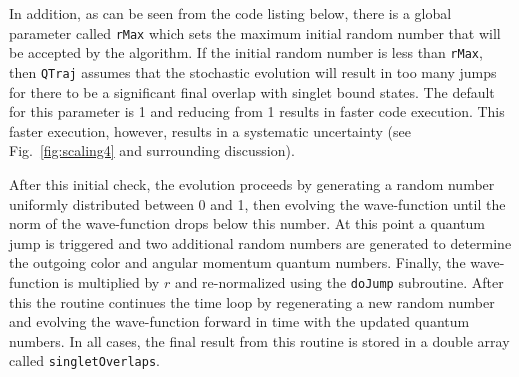 \documentclass[times,sort&compress,final]{elsarticle}
\def\qtraj{{\tt QTraj} }
\begin{document}
In addition, as can be seen from the code listing below, there is a global parameter called {\tt rMax} which sets the maximum initial random number that will be accepted by the algorithm.  
If the initial random number is less than {\tt rMax}, then \qtraj assumes that the stochastic evolution will result in too many jumps for there to be a significant final overlap with singlet bound states.  
The default for this parameter is 1 and reducing from 1 results in faster code execution.  
This faster execution, however, results in a systematic uncertainty (see Fig.~\ref{fig:scaling4} and surrounding discussion).

After this initial check, the evolution proceeds by generating a random number uniformly distributed between 0 and 1, then evolving the wave-function until the norm of the wave-function drops below this number.  
At this point a quantum jump is triggered and two additional random numbers are generated to determine the outgoing color and angular momentum quantum numbers.  
Finally, the wave-function is multiplied by $r$ and re-normalized using the {\tt doJump} subroutine.  
After this the routine continues the time loop by regenerating a new random number and evolving the wave-function forward in time with the updated quantum numbers.  
In all cases, the final result from this routine is stored in a double array called {\tt singletOverlaps}. 
%
\end{document}
